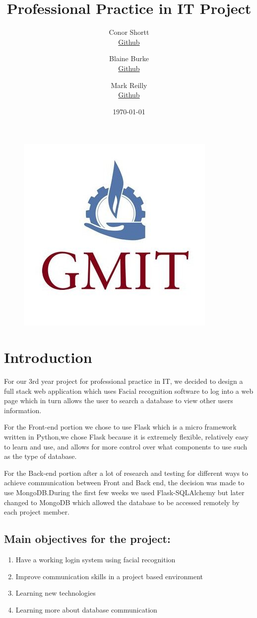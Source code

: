 \documentclass{article}
\title{Professional Practice in IT Project}
\author{
  Conor Shortt\\
  \href{https://github.com/conorshortt123}{Github}
  \and
  Blaine Burke\\
  \href{https://github.com/BurkeBlaine1999}{Github}
  \and
  Mark Reilly\\
  \href{https://github.com/MarkReillyGMIT}{Github}
}
\date{\today}
\begin{document}
\begin{figure}
    \centering
    \includegraphics[scale=0.3]{./images/gmit.jpg}
\end{figure}

\maketitle


\tableofcontents
\newpage


\section{Introduction}
For our 3rd year project for professional practice in IT, we decided to design a full stack web application which uses Facial recognition software\cite{ageitgey} to log into a web page which
in turn allows the user to search a database to view other users information.\medskip

For the Front-end portion we chose to use Flask which is a micro framework written in Python,we chose Flask because it is extremely flexible, relatively easy to learn and use, and allows for more control over what components to use such as the type of database.\medskip

For the Back-end portion after a lot of research and testing for different ways to achieve communication between Front and Back end, the decision was made to use MongoDB.During the first few weeks we used Flask-SQLAlchemy but later changed to MongoDB which allowed the database to be accessed remotely by each project member.\medskip

\subsection{Main objectives for the project:}\begin{enumerate}
\item Have a working login system using facial recognition
\item Improve communication skills in a project based environment 
\item Learning new technologies
\item Learning more about database communication
\end{enumerate}
\end{document}
